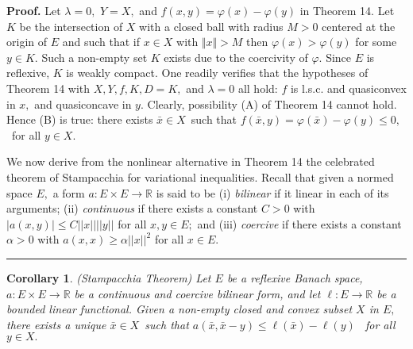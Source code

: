 \documentclass{article}
\newtheorem{corollary}[theorem]{Corollary}
\newenvironment{proof}[1][Proof]{\noindent\textbf{#1.} }{\ \rule{0.5em}{0.5em}}
\begin{document}
\begin{proof}
Let $\lambda =0,$ $Y=X,$ and $f(x,y)=\varphi (x)-\varphi (y)$ in Theorem 14.
Let $K$ be the intersection of $X$ with a closed ball with radius $M>0$
centered at the origin of $E$ and such that if $x\in X$ with $\Vert x\Vert
>M $ then $\varphi (x)>\varphi (y)$ for some $y\in K.$ Such a non-empty set $%
K$ exists due to the coercivity of $\varphi .$ Since $E$ is reflexive, $K$
is weakly compact. One readily verifies that the hypotheses of Theorem 14
with $X,Y,f,K,D=K,$ and $\lambda =0$ all hold: $f$ is l.s.c. and quasiconvex
in $x, $ and quasiconcave in $y.$ Clearly, possibility (A) of Theorem 14
cannot hold. Hence (B) is true: there exists $\bar{x}\in X$\ such that $f(%
\bar{x},y)=\varphi (\bar{x})-\varphi (y)\leq 0,$\ for all $y\in X.$

We now derive from the nonlinear alternative in Theorem 14 the celebrated
theorem of Stampacchia for variational inequalities. Recall that given a
normed space $E,$ a form $a:E\times E\longrightarrow 
\mathbb{R}
$ is said to be (i) \textit{bilinear} if it linear in each of its arguments;
(ii) \textit{continuous} if there exists a constant $C>0$ with $|a(x,y)|\leq
C||x||||y||$ for all $x,y\in E;$ and (iii) \textit{coercive} if there exists
a constant $\alpha >0$ with $a(x,x)\geq \alpha ||x||^{2}$ for all $x\in E.$
\end{proof}

\begin{corollary}
(Stampacchia Theorem) Let $E$ be a reflexive Banach space, $a:E\times
E\longrightarrow 
\mathbb{R}
$ be a continuous and coercive bilinear form, and let $\ell
:E\longrightarrow 
\mathbb{R}
$ be a bounded linear functional. Given a non-empty closed and convex subset 
$X$ in $E,$ there exists a unique $\bar{x}\in X$\ such that $a(\bar{x},\bar{x%
}-y)\leq \ell (\bar{x})-\ell (y)$ \ for all $y\in X.$
\end{corollary}
\end{document}
